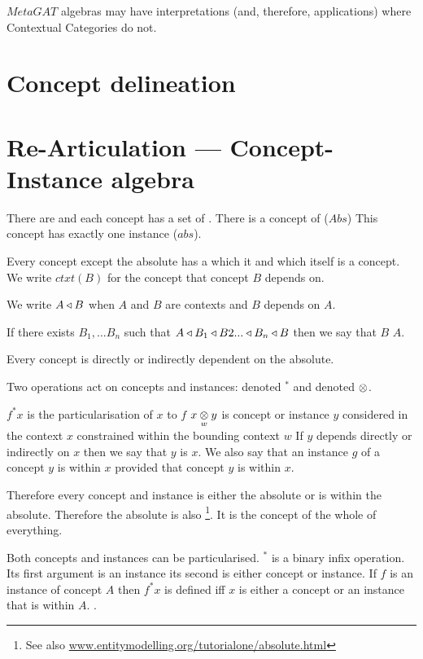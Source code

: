 \documentclass[10pt,a4paper]{article}
\begin{document}
\noindent $MetaGAT$ algebras may have interpretations (and, therefore, applications) where Contextual Categories do not.

\section{Concept delineation}

\section{Re-Articulation ---  Concept-Instance algebra}

\note
There are  and each concept has a set of . There is a concept of ($Abs$)
 This concept has exactly one instance ($abs$). 

\note
Every concept except the absolute has a  which it  and which itself is a concept. 
We write $ctxt(B)$
for the  concept that concept $B$ depends on.

We write $A \base B$  when  $A$ and $B$ are contexts and $B$ depends on $A$.

\note
If there exists $B_1,...B_n$ such that
$A \base B_1 \base B2 ... \base B_n \base B$ then we say that $B$  $A$.

\note Every concept is directly or indirectly dependent on the absolute.

\note
Two operations act on concepts and instances:  denoted
$^*$ and   denoted $\cross$.

\note
$f^*x$ is the particularisation of $x$ to $f$
\note
$\crossx{x}{y}{w}$ is concept or instance $y$ considered in the context $x$ constrained within the bounding context $w$
\note
If $y$ depends directly or indirectly on $x$ then we say that $y$ is  $x$.
We also say that an instance $g$ of a concept $y$ is within $x$ provided that concept $y$ is within $x$.

\note 
Therefore every concept and instance is either the absolute or is within the absolute.
Therefore the absolute  is also \footnote{See also \url{www.entitymodelling.org/tutorialone/absolute.html}}. It is the concept of the whole of everything.


 \newpage

\note
Both concepts and instances can be particularised.
$^*$ is a binary infix operation. Its first argument is an instance its second is either concept or instance.
If $f$ is an instance of concept $A$ then $f^*x$ is defined iff $x$ is either a concept or an instance that is within $A$. 
.
\end{document}
